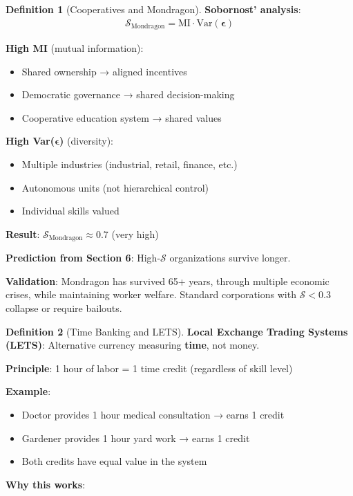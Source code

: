 \documentclass[11pt,a4paper]{article}
\theoremstyle{definition}
\newtheorem{definition}{Definition}[section]
\theoremstyle{remark}
\begin{document}
\begin{enumerate}
\begin{definition}[Cooperatives and Mondragon]
\textbf{Sobornost' analysis}:
\begin{align}
\mathcal{S}_{\text{Mondragon}} = \text{MI} \cdot \text{Var}(\boldsymbol{\epsilon})
\end{align}

\textbf{High MI} (mutual information):
\begin{itemize}
    \item Shared ownership → aligned incentives
    \item Democratic governance → shared decision-making
    \item Cooperative education system → shared values
\end{itemize}

\textbf{High Var(\(\boldsymbol{\epsilon}\))} (diversity):
\begin{itemize}
    \item Multiple industries (industrial, retail, finance, etc.)
    \item Autonomous units (not hierarchical control)
    \item Individual skills valued
\end{itemize}

\textbf{Result}: \(\mathcal{S}_{\text{Mondragon}} \approx 0.7\) (very high)

\textbf{Prediction from Section 6}: High-\(\mathcal{S}\) organizations survive longer.

\textbf{Validation}: Mondragon has survived 65+ years, through multiple economic crises, while maintaining worker welfare. Standard corporations with \(\mathcal{S} < 0.3\) collapse or require bailouts.
\end{definition}

\begin{definition}[Time Banking and LETS]
\textbf{Local Exchange Trading Systems (LETS)}: Alternative currency measuring \textbf{time}, not money.

\textbf{Principle}: 1 hour of labor = 1 time credit (regardless of skill level)

\textbf{Example}:
\begin{itemize}
    \item Doctor provides 1 hour medical consultation → earns 1 credit
    \item Gardener provides 1 hour yard work → earns 1 credit
    \item Both credits have equal value in the system
\end{itemize}

\textbf{Why this works}:


\end{definition}
\end{enumerate}
\end{document}
